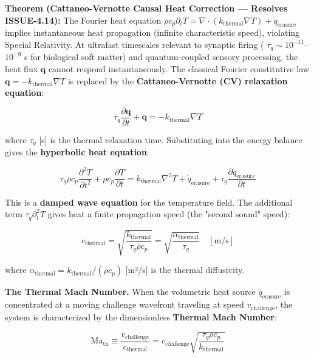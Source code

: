 \documentclass[11pt,a4paper]{article}
\theoremstyle{definition}
\theoremstyle{remark}
\begin{document}
\textbf{Theorem (Cattaneo-Vernotte Causal Heat Correction — Resolves ISSUE-4.14):} The Fourier heat equation $\rho c_p \partial_t T = \nabla \cdot (k_{\text{thermal}} \nabla T) + \dot{q}_{\text{erasure}}$ implies instantaneous heat propagation (infinite characteristic speed), violating Special Relativity. At ultrafast timescales relevant to synaptic firing ( $\tau_q \sim 10^{-11}$–$10^{-9}$ s for biological soft matter) and quantum-coupled sensory processing, the heat flux $\mathbf{q}$ cannot respond instantaneously. The classical Fourier constitutive law $\mathbf{q} = -k_{\text{thermal}} \nabla T$ is replaced by the \textbf{Cattaneo-Vernotte (CV) relaxation equation}:


\begin{equation}
\boxed{\tau_q \frac{\partial \mathbf{q}}{\partial t} + \mathbf{q} = -k_{\text{thermal}} \nabla T}
\end{equation}


where $\tau_q$ [s] is the thermal relaxation time. Substituting into the energy balance gives the \textbf{hyperbolic heat equation}:


\begin{equation}
\boxed{\tau_q \rho c_p \frac{\partial^2 T}{\partial t^2} + \rho c_p \frac{\partial T}{\partial t} = k_{\text{thermal}} \nabla^2 T + \dot{q}_{\text{erasure}} + \tau_q \frac{\partial \dot{q}_{\text{erasure}}}{\partial t}}
\end{equation}


This is a \textbf{damped wave equation} for the temperature field. The additional term $\tau_q \partial_t^2 T$ gives heat a finite propagation speed (the "second sound" speed):


\begin{equation}
c_{\text{thermal}} = \sqrt{\frac{k_{\text{thermal}}}{\tau_q \rho c_p}} = \sqrt{\frac{\alpha_{\text{thermal}}}{\tau_q}} \quad [\text{m/s}]
\end{equation}


where $\alpha_{\text{thermal}} = k_{\text{thermal}}/(\rho c_p)$ [m²/s] is the thermal diffusivity.

\textbf{The Thermal Mach Number.} When the volumetric heat source $\dot{q}_{\text{erasure}}$ is concentrated at a moving challenge wavefront traveling at speed $v_{\text{challenge}}$, the system is characterized by the dimensionless \textbf{Thermal Mach Number}:


\begin{equation}
\boxed{\mathrm{Ma}_{\text{th}} \equiv \frac{v_{\text{challenge}}}{c_{\text{thermal}}} = v_{\text{challenge}} \sqrt{\frac{\tau_q \rho c_p}{k_{\text{thermal}}}}}
\end{equation}
\end{document}
